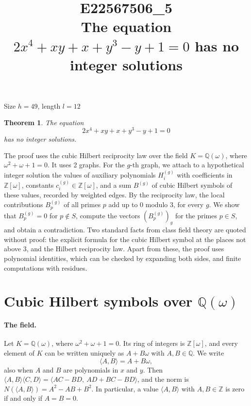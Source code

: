 \documentclass[11pt]{article}
\title{\textbf{E22567506\_5}\\[4pt] {\Large The equation $2x^{4}+xy+x+y^{3}-y+1=0$ has no integer solutions}}
\author{}
\date{}
\newtheorem{theorem}{Theorem}
\newcommand{\Z}{\mathbb{Z}}
\newcommand{\Q}{\mathbb{Q}}
\begin{document}
\maketitle
\vspace{-8ex}
\begin{center}
Size $h=49$, length $l=12$
\end{center}

\begin{theorem}\label{thm:main}
The equation
\begin{equation}\label{eq:main}
2x^{4}+xy+x+y^{3}-y+1=0
\end{equation}
has no integer solutions.
\end{theorem}

The proof uses the cubic Hilbert reciprocity law over the field $K=\Q(\omega)$, where $\omega^2+\omega+1=0$. It uses 2 graphs. For the $g$-th graph, we attach to a hypothetical integer solution the values of auxiliary polynomials $H^{(g)}_i$ with coefficients in $\Z[\omega]$, constants $c^{(g)}_i\in\Z[\omega]$, and a sum $B^{(g)}$ of cubic Hilbert symbols of these values, recorded by weighted edges. By the reciprocity law, the local contributions $B^{(g)}_p$ of all primes $p$ add up to $0$ modulo $3$, for every $g$. We show that $B^{(g)}_p=0$ for $p\notin S$, compute the vectors $(B^{(g)}_p)_g$ for the primes $p\in S$, and obtain a contradiction. Two standard facts from class field theory are quoted without proof: the explicit formula for the cubic Hilbert symbol at the places not above $3$, and the Hilbert reciprocity law. Apart from these, the proof uses polynomial identities, which can be checked by expanding both sides, and finite computations with residues.


\section{\texorpdfstring{Cubic Hilbert symbols over $\Q(\omega)$}{Cubic Hilbert symbols over Q(w)}}\label{sec:symbols}

\paragraph{The field.} Let $K=\Q(\omega)$, where $\omega^2+\omega+1=0$. Its ring of integers is $\Z[\omega]$, and every element of $K$ can be written uniquely as $A+B\omega$ with $A,B\in\Q$. We write
\[
\langle A,B\rangle=A+B\omega,
\]
also when $A$ and $B$ are polynomials in $x$ and $y$. Then $\langle A,B\rangle\langle C,D\rangle=\langle AC-BD,\ AD+BC-BD\rangle$, and the norm is $N(\langle A,B\rangle)=A^2-AB+B^2$. In particular, a value $\langle A,B\rangle$ with $A,B\in\Z$ is zero if and only if $A=B=0$.
\end{document}
